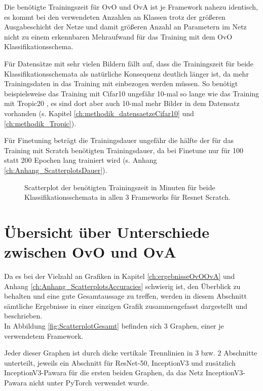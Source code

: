 Die benötigte Trainingszeit für OvO und OvA ist je Framework nahezu identisch, es kommt bei den verwendeten Anzahlen an Klassen trotz der größeren Ausgabeschicht der Netze und damit größeren Anzahl an Parametern im Netz nicht zu einem erkennbaren Mehraufwand für das Training mit dem OvO Klassifikationsschema.

Für Datensätze mit sehr vielen Bildern fällt auf, dass die Trainingszeit für beide Klassifikationsschemata als natürliche Konsequenz deutlich länger ist, da mehr Trainingsdaten in das Training mit einbezogen werden müssen. So benötigt beispielsweise das Training mit Cifar10 \cite{cifar10} ungefähr 10-mal so lange wie das Training mit Tropic20 \cite{pawaraWebsiteDatensaetze}, es sind dort aber auch 10-mal mehr Bilder in dem Datensatz vorhanden (s. Kapitel \ref{ch:methodik_datensaetzeCifar10} und \ref{ch:methodik_Tropic}).

Für Finetuning beträgt die Trainingsdauer ungefähr die hälfte der für das Training mit Scratch benötigten Trainingsdauer, da bei Finetune nur für 100 statt 200 Epochen lang trainiert wird (s. Anhang \ref{ch:Anhang_ScatterplotsDauer}).


\begin{figure}[H]
\begin{adjustbox}{width=\textwidth, center}

\end{adjustbox}
\caption{Scatterplot der benötigten Trainingszeit in Minuten für beide Klassifikationsschemata in allen 3 Frameworks für Resnet Scratch.}
\label{fig:ScatterplotRS-dauer}
\end{figure}

\section{Übersicht über Unterschiede zwischen OvO und OvA}
Da es bei der Vielzahl an Grafiken in Kapitel \ref{ch:ergebnisseOvOOvA} und Anhang \ref{ch:Anhang_ScatterplotsAccuracies} schwierig ist, den Überblick zu behalten und eine gute Gesamtaussage zu treffen, werden in diesem Abschnitt sämtliche Ergebnisse in einer einzigen Grafik zusammengefasst dargestellt und beschrieben.\\

In Abbildung \ref{fig:ScatterplotGesamt} befinden sich 3 Graphen, einer je verwendetem Framework.

Jeder dieser Graphen ist durch dicke vertikale Trennlinien in 3 bzw. 2 Abschnitte unterteilt, jeweils ein Abschnitt für ResNet-50, InceptionV3 und zusätzlich InceptionV3-Pawara für die ersten beiden Graphen, da das Netz InceptionV3-Pawara nicht unter PyTorch \cite{pytorch} verwendet wurde.


